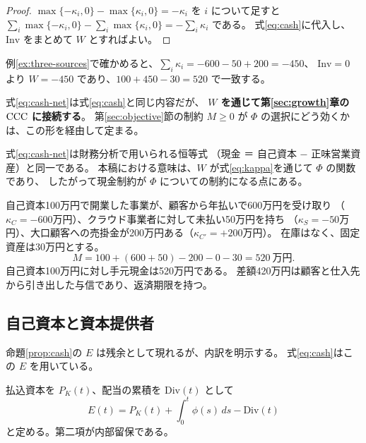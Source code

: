 \begin{proof}
$\max\{-\kappa_i,0\}-\max\{\kappa_i,0\}=-\kappa_i$ を $i$ について足すと
$\sum_i\max\{-\kappa_i,0\}-\sum_i\max\{\kappa_i,0\}=-\sum_i\kappa_i$ である。
式\eqref{eq:cash}に代入し、$\mathrm{Inv}$ をまとめて $W$ とすればよい。
\end{proof}

例\ref{ex:three-sources}で確かめると、$\sum_i\kappa_i=-600-50+200=-450$、
$\mathrm{Inv}=0$ より $W=-450$ であり、$100+450-30=520$ で一致する。

式\eqref{eq:cash-net}は式\eqref{eq:cash}と同じ内容だが、
\textbf{$W$ を通じて第\ref{sec:growth}章の $\mathrm{CCC}$ に接続する}。
第\ref{sec:objective}節の制約 $M\geq 0$ が
$\Phi$ の選択にどう効くかは、この形を経由して定まる。

\begin{remark}[既存の恒等式である]
式\eqref{eq:cash-net}は財務分析で用いられる恒等式
（現金 ＝ 自己資本 $-$ 正味営業資産）と同一である。
本稿における意味は、$W$ が式\eqref{eq:kappa}を通じて $\Phi$ の関数であり、
したがって現金制約が $\Phi$ についての制約になる点にある。
\end{remark}

\begin{example}[三者からの調達]
\label{ex:three-sources}
自己資本100万円で開業した事業が、顧客から年払いで600万円を受け取り
（$\kappa_C=-600$万円）、クラウド事業者に対して未払い50万円を持ち
（$\kappa_S=-50$万円）、大口顧客への売掛金が200万円ある（$\kappa_{C'}=+200$万円）。
在庫はなく、固定資産は30万円とする。
\[
M = 100 + (600+50) - 200 - 0 - 30 = 520\ \text{万円}.
\]
自己資本100万円に対し手元現金は520万円である。
差額420万円は顧客と仕入先から引き出した与信であり、返済期限を持つ。
\end{example}

\subsection{自己資本と資本提供者}
\label{sec:equity}

命題\ref{prop:cash}の $E$ は残余として現れるが、内訳を明示する。
式\eqref{eq:cash}はこの $E$ を用いている。

\begin{definition}[自己資本]
\label{def:equity}
払込資本を $P_K(t)$、配当の累積を $\mathrm{Div}(t)$ として
\begin{equation}
E(t) = P_K(t) + \int_0^t \phi(s)\,ds - \mathrm{Div}(t)
\label{eq:equity}
\end{equation}
と定める。第二項が内部留保である。
\end{definition}

